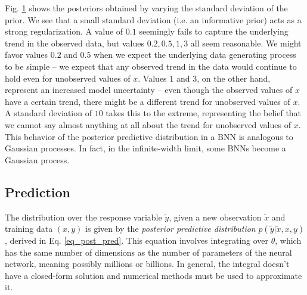 \documentclass[12pt]{article}
\begin{document}
Fig. \ref{fig_1d_predictions_by_stdev} shows the posteriors obtained by varying the standard deviation of the prior. We see that a small standard deviation (i.e. an informative prior) acts as a strong regularization. A value of $0.1$ seemingly fails to capture the underlying trend in the observed data, but values $0.2, 0.5, 1, 3$ all seem reasonable. We might favor values $0.2$ and $0.5$ when we expect the underlying data generating process to be simple -- we expect that any observed trend in the data would continue to hold even for unobserved values of $x$. Values $1$ and $3$, on the other hand, represent an increased model uncertainty -- even though the observed values of $x$ have a certain trend, there might be a different trend for unobserved values of $x$. A standard deviation of $10$ takes this to the extreme, representing the belief that we cannot say almost anything at all about the trend for unobserved values of $x$. This behavior of the posterior predictive distribution in a BNN is analogous to Gaussian processes. In fact, in the infinite-width limit, some BNNs become a Gaussian process. \cite{neural_tangents}

\begin{figure}[h]
\centering
{}
\caption{}
\label{fig_1d_predictions_by_stdev}
\end{figure}

\subsection{Prediction}

The distribution over the response variable $\tilde{y}$, given a new observation $\tilde{x}$ and training data $(x, y)$ is given by the \textit{posterior predictive distribution} $p(\tilde{y} | \tilde{x}, x, y)$, derived in Eq. \ref{eq_post_pred}. This equation involves integrating over $\theta$, which has the same number of dimensions as the number of parameters of the neural network, meaning possibly millions or billions. In general, the integral doesn't have a closed-form solution and numerical methods must be used to approximate it.
\end{document}
